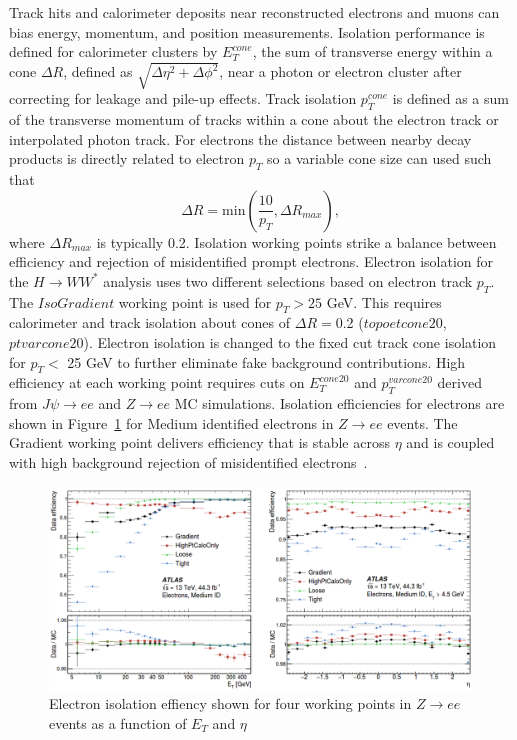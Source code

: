 Track hits and calorimeter deposits near reconstructed electrons and muons can bias energy, momentum, and position measurements. Isolation performance is defined for calorimeter clusters by $E_T^{cone}$, the sum of transverse energy within a cone $\Delta R$, defined as $\sqrt{\Delta\eta^2+\Delta\phi^2}$, near a photon or electron cluster after correcting for leakage and pile-up effects. Track isolation $p_T^{cone}$ is defined as a sum of the transverse momentum of tracks within a cone about the electron track or interpolated photon track. For electrons the distance between nearby decay products is directly related to electron $p_T$ so a variable cone size can used such that 
\begin{equation}
\Delta R = \text{min}(\frac{10}{p_T},\Delta R_{max}),
\end{equation}
where $\Delta R_{max}$ is typically 0.2. Isolation working points strike a balance between efficiency and rejection of misidentified prompt electrons. Electron isolation for the $H\rightarrow WW^*$ analysis uses two different selections based on electron track $p_T$. The $IsoGradient$ working point is used for $p_T > 25$ GeV. This requires calorimeter and track isolation about cones of $\Delta R=$0.2 ($topoetcone20$, $ptvarcone20$). Electron isolation is changed to the fixed cut track cone isolation for $p_T <$ 25 GeV to further eliminate fake background contributions. High efficiency at each working point requires cuts on $E_T^{cone20}$ and $p_T^{varcone20}$ derived from $J\psi\rightarrow ee$ and $Z\rightarrow ee$ MC simulations. Isolation efficiencies for electrons are shown in Figure~\ref{fig:ElectronIsoEff} for Medium identified electrons in $Z\rightarrow ee$ events. The Gradient working point delivers efficiency that is stable across $\eta$ and is coupled with high background rejection of misidentified electrons~\cite{ElectronPhotonPerformance}.  

\begin{figure}[!h]
        \centering
    \includegraphics[width=.65\textwidth]{Pictures/ElectronIsoEff.png}
    \caption{ Electron isolation effiency shown for four working points in $Z\rightarrow ee$ events as a function of $E_T$ and $\eta$~\cite{ElectronPhotonPerformance}}
    \label{fig:ElectronIsoEff}
\end{figure}

